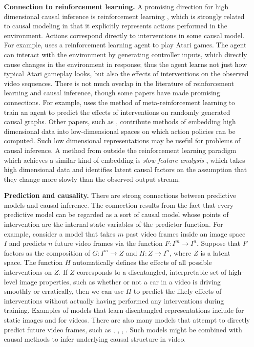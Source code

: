 \documentclass[letterpaper, twocolumn]{article} %
\begin{document}
\noindent \textbf{Connection to reinforcement learning.} A promising direction for high dimensional causal inference is reinforcement learning \cite{sutton2018reinforcement}, which is strongly related to causal modeling in that it explicitly represents actions performed in the environment. Actions correspond directly to interventions in some causal model. For example, \cite{oh2015action} uses a reinforcement learning agent to play Atari games. The agent can interact with the environment by generating controller inputs, which directly cause changes in the environment in response; thus the agent learns not just how typical Atari gameplay looks, but also the effects of interventions on the observed video sequences. There is not much overlap in the literature of reinforcement learning and causal inference, though some papers have made promising connections. For example, \cite{dasgupta2019causal} uses the method of meta-reinforcement learning to train an agent to predict the effects of interventions on randomly generated causal graphs. Other papers, such as \cite{lange2012autonomous}, contribute methods of embedding high dimensional data into low-dimensional spaces on which action policies can be computed. Such low dimensional representations may be useful for problems of causal inference. A method from outside the reinforcement learning paradigm which achieves a similar kind of embedding is \emph{slow feature analysis} \cite{kompella2011incremental}, which takes high dimensional data and identifies latent causal factors on the assumption that they change more slowly than the observed output stream.

\noindent \textbf{Prediction and causality.} There are strong connections between predictive models and causal inference. The connection results from the fact that every predictive model can be regarded as a sort of causal model whose points of intervention are the internal state variables of the predictor function. For example, consider a model that takes $m$ past video frames inside an image space $I$ and predicts $n$ future video frames via the function $F: I^m \rightarrow I^n$. Suppose that $F$ factors as the composition of $G: I^m \rightarrow Z$ and $H: Z \rightarrow I^n$, where $Z$ is a latent space. The function $H$ automatically defines the effects of all possible interventions on $Z$. If $Z$ corresponds to a disentangled, interpretable set of high-level image properties, such as whether or not a car in a video is driving smoothly or erratically, then we can use $H$ to predict the likely effects of interventions without actually having performed any interventions during training. Examples of models that learn disentangled representations include \cite{chen2016infogan} for static images and \cite{denton2017unsupervised} for videos. There are also many models that attempt to directly predict future video frames, such as \cite{babaeizadeh2017stochastic}, \cite{lotter2016deep}, \cite{finn2016unsupervised}, \cite{walker2014patch}. Such models might be combined with causal methods to infer underlying causal structure in video.
\end{document}
